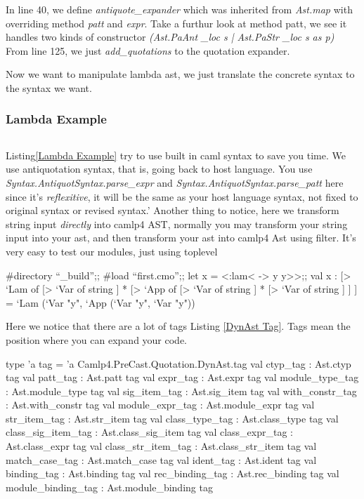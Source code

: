 \inputminted[fontsize=\scriptsize,linenos=true,stepnumber=5]
{ocaml}{code/camlp4/antiquot_expander/antiquot_expander.ml}

In line 40, we define \textit{antiquote\_expander} which was inherited
from \textit{Ast.map} with overriding method \textit{patt} and
\textit{expr}. Take a furthur look at method patt, we see it handles
two kinds of constructor \textit{(Ast.PaAnt \_loc s | Ast.PaStr \_loc
  s as p)} From line 125, we just \textit{add\_quotations} to the
quotation expander.

Now we want to manipulate lambda ast, we just translate the
 concrete syntax to the syntax we want.

\subsubsection{Lambda Example}
\inputminted[fontsize=\scriptsize,linenos=true,stepnumber=5]
{ocaml}{code/camlp4/lambda/first.ml}

Listing\ref{Lambda Example} try to use built in caml syntax to save
you time.  We use antiquotation syntax, that is, going back to host
language.  You use \textit{Syntax.AntiquotSyntax.parse\_expr} and
\textit{Syntax.AntiquotSyntax.parse\_patt} here since it's
\textit{reflexitive}, it will be the same as your host language
syntax, not fixed to original syntax or revised syntax.'
Another thing to notice, here we transform string input \textit{directly} into
camlp4 AST, normally you may transform your string input into your
ast, and then transform your ast into camlp4 Ast using filter.
It's very easy to test our modules, just using toplevel
\begin{ocamlcode}
  #directory ``_build'';;
  #load ``first.cmo'';;
  let x = <:lam< \y -> y y>>;;
val x :
  [> `Lam of
       [> `Var of string ] *
       [> `App of [> `Var of string ] * [> `Var of string ] ] ] =
  `Lam (`Var "y", `App (`Var "y", `Var "y"))  
\end{ocamlcode}
Here we notice that there are a lot of tags Listing \ref{DynAst
  Tag}. Tags mean the position where you can expand your code. 
\begin{ocamlcode}
    type 'a tag = 'a Camlp4.PreCast.Quotation.DynAst.tag
    val ctyp_tag : Ast.ctyp tag
    val patt_tag : Ast.patt tag
    val expr_tag : Ast.expr tag
    val module_type_tag : Ast.module_type tag
    val sig_item_tag : Ast.sig_item tag
    val with_constr_tag : Ast.with_constr tag
    val module_expr_tag : Ast.module_expr tag
    val str_item_tag : Ast.str_item tag
    val class_type_tag : Ast.class_type tag
    val class_sig_item_tag : Ast.class_sig_item tag
    val class_expr_tag : Ast.class_expr tag
    val class_str_item_tag : Ast.class_str_item tag
    val match_case_tag : Ast.match_case tag
    val ident_tag : Ast.ident tag
    val binding_tag : Ast.binding tag
    val rec_binding_tag : Ast.rec_binding tag
    val module_binding_tag : Ast.module_binding tag
  \end{ocamlcode}




